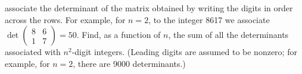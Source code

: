 associate the determinant of the matrix obtained by writing the
digits in order across the rows. For example, for $n=2$, to the
integer 8617 we associate $\det \left(
 \begin{array}{cc} 8 & 6 \\
1 & 7 \end{array} \right) = 50$. Find, as a function of $n$, the
sum of all the determinants associated with $n^{2}$-digit
integers. (Leading digits are assumed to be nonzero; for example,
for $n=2$, there are 9000 determinants.)
